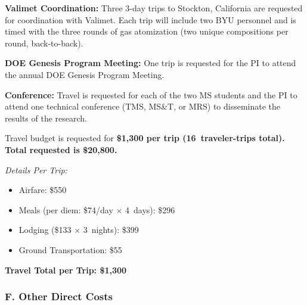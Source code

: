 \documentclass[11pt,letterpaper]{article}
\begin{document}
\textbf{Valimet Coordination:} Three 3-day trips to Stockton,
California are requested for coordination with Valimet. Each trip
will include two BYU personnel and is timed with the three rounds
of gas atomization (two unique compositions per round, back-to-back).

\textbf{DOE Genesis Program Meeting:} One trip is requested for the
PI to attend the annual DOE Genesis Program Meeting.

\textbf{Conference:} Travel is requested for each of the two MS
students and the PI to attend one technical conference (TMS, MS\&T,
or MRS) to disseminate the results of the research.

Travel budget is requested for \textbf{\$1,300 per trip
(16~traveler-trips total). Total requested is \$20,800.}

\textit{Details Per Trip:}
\begin{itemize}\setlength{\itemsep}{0pt}
  \item Airfare: \$550
  \item Meals (per diem: \$74/day $\times$ 4~days): \$296
  \item Lodging (\$133 $\times$ 3~nights): \$399
  \item Ground Transportation: \$55
\end{itemize}
\textbf{Travel Total per Trip: \$1,300}

\subsubsection*{F. Other Direct Costs}
\end{document}
